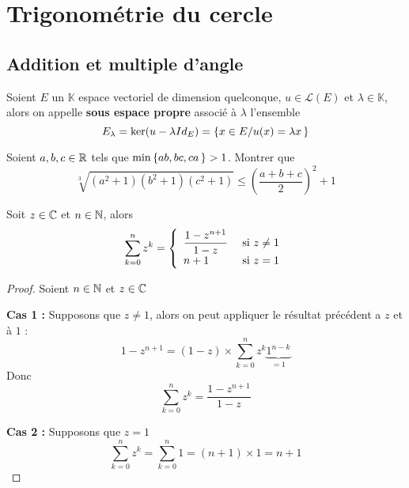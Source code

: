 \documentclass{fancybook}
\begin{document}
%
%
%
%

\pagestyle{default}

\section{Trigonométrie du cercle}

\subsection{Addition et multiple d'angle}

\begin{definition}
Soient $E$ un $\mathbb{K}$ espace vectoriel de dimension quelconque, $u \in \mathscr{L}(E)$ et $\lambda \in \mathbb{K}$, alors on appelle \textbf{sous espace propre} associé à $\lambda$ l'ensemble 
\[
E_\lambda=\ker(u-\lambda Id_E)=\set{x \in E / u(x)= \lambda x }
\]
\end{definition}


\begin{exercice}
Soient $a, b, c \in \mathbb{R}$ tels que $\min\set{ab, bc, ca} > 1$. Montrer que 
\[
\sqrt[3]{(a^2+1)(b^2+1)(c^2+1)} \le \left( \dfrac{a + b + c}{2} \right)^2 + 1
\]
\end{exercice}

\begin{lemma}
\label{somme:suite:geometrique}
Soit $z \in \mathbb{C}$ et $n \in \mathbb{N}$, alors 
\[
\displaystyle\sum\limits_{k=0}^{n} z^k =
\left\{
\begin{array}{l l}
\dfrac{1-z^{n+1}}{1-z} &\text{ si } z \ne 1\\
n + 1 &\text{ si } z = 1
\end{array}
\right.
\]
\end{lemma}

\begin{proof}
Soient $n \in \mathbb{N}$ et $z \in \mathbb{C}$

\textbf{Cas 1 :} Supposons que $z \ne 1$, alors on peut appliquer le résultat précédent a $z$ et à $1$ : 
\[
1 - z^{n+1} = (1-z)\times\displaystyle\sum\limits_{k=0}^{n} z^k \underbrace{1^{n - k}}_{=1}
\]
Donc 
\[
\displaystyle\sum\limits_{k=0}^{n} z^k = \dfrac{1-z^{n+1}}{1-z}
\]

\textbf{Cas 2 :} Supposons que $z = 1$
\[
\displaystyle\sum\limits_{k=0}^{n} z^k = \displaystyle\sum\limits_{k=0}^{n} 1 = (n+1) \times 1 = n + 1
\]
\end{proof}
\end{document}
